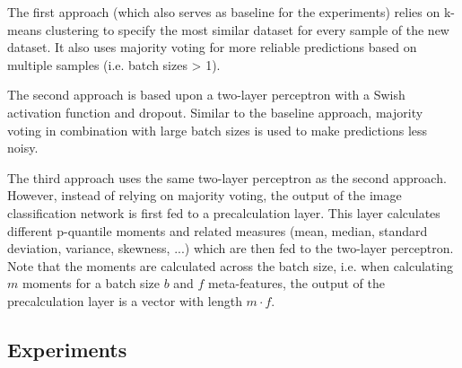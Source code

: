 \documentclass{article}
\begin{document}
The first approach (which also serves as baseline for the experiments) relies on k-means clustering to specify the most similar dataset for every sample of the new dataset. It also uses majority voting for more reliable predictions based on multiple samples (i.e. batch sizes > 1).

The second approach is based upon a two-layer perceptron with a Swish activation function and dropout. Similar to the baseline approach, majority voting in combination with large batch sizes is used to make predictions less noisy.

The third approach uses the same two-layer perceptron as the second approach. However, instead of relying on majority voting, the output of the image classification network is first fed to a precalculation layer. This layer calculates different p-quantile moments and related measures (mean, median, standard deviation, variance, skewness, ...) which are then fed to the two-layer perceptron. Note that the moments are calculated across the batch size, i.e. when calculating $m$ moments for a batch size $b$ and $f$ meta-features, the output of the precalculation layer is a vector with length $m \cdot f$. 

\subsection{Experiments}
\label{sec:expressiveMeta}
\end{document}
